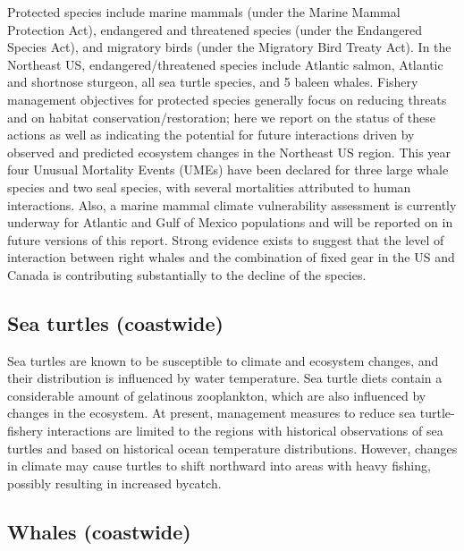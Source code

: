 \documentclass[10pt,]{article}
\begin{document}
Protected species include marine mammals (under the Marine Mammal
Protection Act), endangered and threatened species (under the Endangered
Species Act), and migratory birds (under the Migratory Bird Treaty Act).
In the Northeast US, endangered/threatened species include Atlantic
salmon, Atlantic and shortnose sturgeon, all sea turtle species, and 5
baleen whales. Fishery management objectives for protected species
generally focus on reducing threats and on habitat
conservation/restoration; here we report on the status of these actions
as well as indicating the potential for future interactions driven by
observed and predicted ecosystem changes in the Northeast US region.
This year four Unusual Mortality Events (UMEs) have been declared for
three large whale species and two seal species, with several mortalities
attributed to human interactions. Also, a marine mammal climate
vulnerability assessment is currently underway for Atlantic and Gulf of
Mexico populations and will be reported on in future versions of this
report. Strong evidence exists to suggest that the level of interaction
between right whales and the combination of fixed gear in the US and
Canada is contributing substantially to the decline of the species.

\subsection{Sea turtles (coastwide)}\label{sea-turtles-coastwide}

Sea turtles are known to be susceptible to climate and ecosystem
changes, and their distribution is influenced by water temperature. Sea
turtle diets contain a considerable amount of gelatinous zooplankton,
which are also influenced by changes in the ecosystem. At present,
management measures to reduce sea turtle-fishery interactions are
limited to the regions with historical observations of sea turtles and
based on historical ocean temperature distributions. However, changes in
climate may cause turtles to shift northward into areas with heavy
fishing, possibly resulting in increased bycatch.

\subsection{Whales (coastwide)}\label{whales-coastwide}
\end{document}
